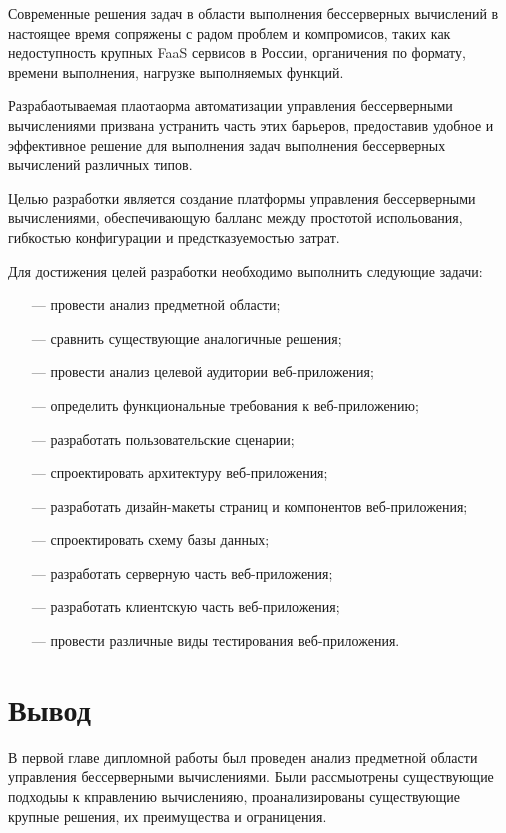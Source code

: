 Современные решения задач в области выполнения бессерверных вычислений в настоящее время сопряжены с радом проблем и компромисов, таких как недоступность крупных FaaS сервисов в России, органичения по формату, времени выполнения, нагрузке выполняемых функций. 

Разрабаотываемая плаотаорма автоматизации управления бессерверными вычислениями призвана устранить часть этих барьеров, предоставив удобное и эффективное решение для выполнения задач выполнения бессерверных вычислений различных типов.

Целью разработки является создание платформы управления бессерверными вычислениями, обеспечивающую балланс между простотой испольования, гибкостью конфигурации и предстказуемостью затрат.

Для достижения целей разработки необходимо выполнить следующие задачи:

\begin{itemize}
    \item[---]провести анализ предметной области;
    \item[---]сравнить существующие аналогичные решения;
    \item[---]провести анализ целевой аудитории веб-приложения;
    \item[---]определить функциональные требования к веб-приложению;
    \item[---]разработать пользовательские сценарии;
    \item[---]спроектировать архитектуру веб-приложения;
    \item[---]разработать дизайн-макеты страниц и компонентов веб-приложения;
    \item[---]спроектировать схему базы данных;
    \item[---]разработать серверную часть веб-приложения;
    \item[---]разработать клиентскую часть веб-приложения;
    \item[---]провести различные виды тестирования веб-приложения.
\end{itemize}

\section{Вывод}


В первой главе дипломной работы был проведен анализ предметной области управления бессерверными вычислениями.
Были рассмыотрены существующие подходыы к кправлению вычисленияю, проанализированы существующие крупные решения, их преимущества и ограницения.

